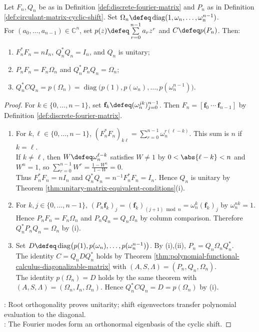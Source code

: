 \begin{theorem} \label{thm:fourier-basis-diagonalizes-cyclic-circulants} \\
Let $F_n,Q_n$ be as in Definition \ref{def:discrete-fourier-matrix} and $P_n$ as in Definition \ref{def:circulant-matrix-cyclic-shift}. Set $\Omega_n\defeq\operatorname{diag}(1,\omega_n,\ldots,\omega_n^{n-1})$.\\
For $(a_0,\ldots,a_{n-1})\in\mathbb{C}^n$, set $p(z)\defeq\sum\limits_{r=0}^{n-1}a_rz^r$ and $C\defeq p(P_n)$. Then:
\begin{enumerate}[label=(\roman*)]
\setlength{\itemsep}{0pt}
\item $F_n^*F_n=nI_n$, $Q_n^*Q_n=I_n$, and $Q_n$ is unitary;
\item $P_nF_n=F_n\Omega_n$ and $Q_n^*P_nQ_n=\Omega_n$;
\item $Q_n^*CQ_n=p(\Omega_n)=\operatorname{diag}\bigl(p(1),p(\omega_n),\ldots,p(\omega_n^{n-1})\bigr)$.
\end{enumerate}
\begin{proof}
For $k\in\{0,\ldots,n-1\}$, set $\mathbf{f}_k\defeq(\omega_n^{jk})_{j=0}^{n-1}$. Then $F_n=[\mathbf{f}_0\ \cdots\ \mathbf{f}_{n-1}]$ by Definition \ref{def:discrete-fourier-matrix}.
\begin{enumerate}[label=(\roman*)]
\setlength{\itemsep}{0pt}
\item For $k,\ell\in\{0,\ldots,n-1\}$, $(F_n^*F_n)_{k\ell}=\sum\limits_{r=0}^{n-1}\omega_n^{r(\ell-k)}$. This sum is $n$ if $k=\ell$.\\
If $k\neq\ell$, then $W\defeq\omega_n^{\ell-k}$ satisfies $W\neq1$ by $0<\abs{\ell-k}<n$ and $W^n=1$, so $\sum\limits_{r=0}^{n-1}W^r=\frac{1-W^n}{1-W}=0$.\\
Thus $F_n^*F_n=nI_n$ and $Q_n^*Q_n=n^{-1}F_n^*F_n=I_n$. Hence $Q_n$ is unitary by Theorem \ref{thm:unitary-matrix-equivalent-conditions}(i).
\item For $k,j\in\{0,\ldots,n-1\}$, $(P_n\mathbf{f}_k)_j=(\mathbf{f}_k)_{(j+1)\bmod n}=\omega_n^k(\mathbf{f}_k)_j$ by $\omega_n^{nk}=1$.\\
Hence $P_nF_n=F_n\Omega_n$ and $P_nQ_n=Q_n\Omega_n$ by column comparison. Therefore $Q_n^*P_nQ_n=\Omega_n$ by (i).
\item Set $D\defeq\operatorname{diag}\bigl(p(1),p(\omega_n),\ldots,p(\omega_n^{n-1})\bigr)$. By (i),(ii), $P_n=Q_n\Omega_nQ_n^*$.\\
The identity $C=Q_nDQ_n^*$ holds by Theorem \ref{thm:polynomial-functional-calculus-diagonalizable-matrix} with $(A,S,\Lambda)=(P_n,Q_n,\Omega_n)$.\\
The identity $p(\Omega_n)=D$ holds by the same theorem with $(A,S,\Lambda)=(\Omega_n,I_n,\Omega_n)$. Hence $Q_n^*CQ_n=D=p(\Omega_n)$ by (i).
\end{enumerate}
: Root orthogonality proves unitarity; shift eigenvectors transfer polynomial evaluation to the diagonal.\\
: The Fourier modes form an orthonormal eigenbasis of the cyclic shift.
\end{proof}
\end{theorem}


